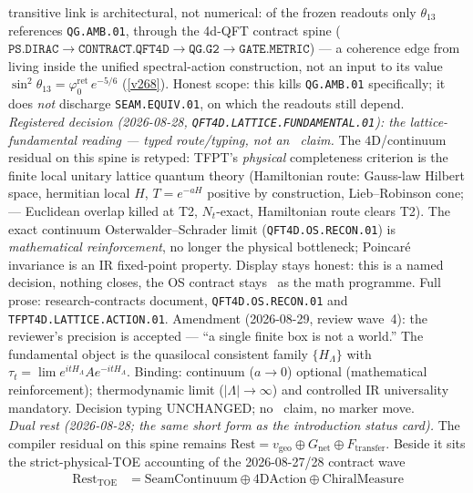 \documentclass[11pt,a4paper]{article}
\newcommand{\phiz}{\varphi_0^{\mathrm{ret}}}
\begin{document}
\begin{keybox}
transitive link is architectural, not numerical: of the frozen readouts only $\theta_{13}$ references
\texttt{QG.AMB.01}, through the 4d-QFT contract spine
($\texttt{PS.DIRAC}{\to}\texttt{CONTRACT.QFT4D}{\to}\texttt{QG.G2}{\to}\texttt{GATE.METRIC}$) --- a
coherence edge from living inside the unified spectral-action construction, not an input to its value
$\sin^2\theta_{13}=\phiz\,e^{-5/6}$ (\vref{v268}). Honest scope: this kills \texttt{QG.AMB.01}
specifically; it does \emph{not} discharge \texttt{SEAM.EQUIV.01}, on which the readouts still depend.
\smallskip\\
\noindent\emph{Registered decision (2026-08-28, \texttt{QFT4D.LATTICE.FUNDAMENTAL.01}):
the lattice-fundamental reading --- typed route/typing, not an \mE\ claim.}
The $4$D/continuum residual on this spine is retyped: TFPT's \emph{physical} completeness
criterion is the finite local unitary lattice quantum theory (Hamiltonian route: Gauss-law
Hilbert space, hermitian local $H$, $T=e^{-aH}$ positive by construction,
Lieb--Robinson cone; 
--- Euclidean overlap killed at T2, $N_t$-exact, Hamiltonian route clears T2).  The exact
continuum Osterwalder--Schrader limit (\texttt{QFT4D.OS.RECON.01}) is \emph{mathematical
reinforcement}, no longer the physical bottleneck; Poincar\'e invariance is an IR fixed-point
property.  Display stays honest: this is a named decision, nothing closes, the OS contract
stays \mO\ as the math programme.  Full prose: research-contracts document,
\texttt{QFT4D.OS.RECON.01} and \texttt{TFPT4D.LATTICE.ACTION.01}.
Amendment (2026-08-29, review wave~4): the reviewer's precision is accepted ---
``a single finite box is not a world.''
The fundamental object is the quasilocal consistent family $\{H_\Lambda\}$ with
$\tau_t=\lim e^{itH_\Lambda}A e^{-itH_\Lambda}$.
Binding: continuum ($a\to0$) optional (mathematical reinforcement); thermodynamic
limit ($|\Lambda|\to\infty$) and controlled IR universality mandatory.
Decision typing UNCHANGED; no \mE\ claim, no marker move.
\smallskip\\
\noindent\emph{Dual rest (2026-08-28; the same short form as the introduction status card).}
The compiler residual on this spine remains $\mathrm{Rest}=v_{\mathrm{geo}}\oplus G_{\mathrm{net}}\oplus F_{\mathrm{transfer}}$.
Beside it sits the strict-physical-TOE accounting of the 2026-08-27/28 contract wave
\[
  \begin{aligned}
  \mathrm{Rest}_{\mathrm{TOE}}
    &=\mathrm{SeamContinuum}\oplus\mathrm{4DAction}\oplus\mathrm{ChiralMeasure}\\

\end{aligned}\]
\end{keybox}
\end{document}
